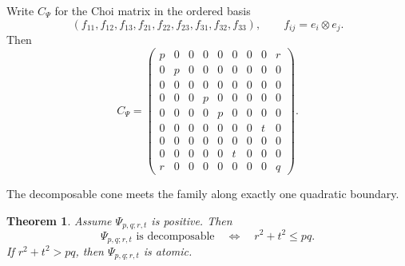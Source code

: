 \documentclass[11pt]{amsart}
\newcommand{\chg}[1]{#1}
\theoremstyle{plain}
\newtheorem{theorem}{Theorem}[section]
\theoremstyle{definition}
\theoremstyle{remark}
\begin{document}
Write $C_\Psi$ for the Choi matrix in the ordered basis
\[
(f_{11},f_{12},f_{13},f_{21},f_{22},f_{23},f_{31},f_{32},f_{33}),
\qquad f_{ij}=e_i\otimes e_j.
\]
Then
\[
C_\Psi=
\begin{pmatrix}
p&0&0&0&0&0&0&0&r\\
0&p&0&0&0&0&0&0&0\\
0&0&0&0&0&0&0&0&0\\
0&0&0&p&0&0&0&0&0\\
0&0&0&0&p&0&0&0&0\\
0&0&0&0&0&0&0&t&0\\
0&0&0&0&0&0&0&0&0\\
0&0&0&0&0&t&0&0&0\\
r&0&0&0&0&0&0&0&q
\end{pmatrix}.
\]

\chg{The decomposable cone meets the family along exactly one quadratic boundary.}

\begin{theorem}\label{thm:exact-decomposability}
Assume $\Psi_{p,q;r,t}$ is positive. Then
\[
\Psi_{p,q;r,t}\text{ is decomposable}
\quad\Longleftrightarrow\quad
r^2+t^2\le pq.
\]
If $r^2+t^2>pq$, then $\Psi_{p,q;r,t}$ is atomic.
\end{theorem}
\end{document}
